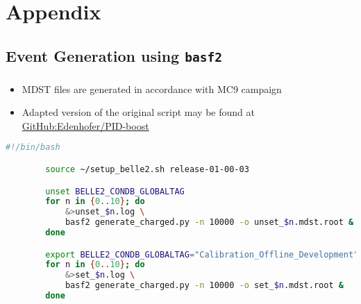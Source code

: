 \documentclass{beamer}
\begin{document}
\section{Appendix}
\subsection{Event Generation using \lstinline|basf2|}
\begin{frame}[fragile]
	\frametitle{\insertsection}
	\framesubtitle{\insertsubsection}

	\begin{itemize}
		\item MDST files are generated in accordance with MC9 campaign
		\item Adapted version of the original script may be found at \href{https://github.com/Edenhofer/PID-boost/blob/master/generate_charged.py}{GitHub:Edenhofer/PID-boost}
	\end{itemize}

	\begin{lstlisting}[language=bash,xleftmargin=-0.16\textwidth,basicstyle=\ttfamily\tiny]
		#!/bin/bash

		source ~/setup_belle2.sh release-01-00-03

		unset BELLE2_CONDB_GLOBALTAG
		for n in {0..10}; do
			&>unset_$n.log \
			basf2 generate_charged.py -n 10000 -o unset_$n.mdst.root &
		done

		export BELLE2_CONDB_GLOBALTAG="Calibration_Offline_Development"
		for n in {0..10}; do
			&>set_$n.log \
			basf2 generate_charged.py -n 10000 -o set_$n.mdst.root &
		done
	\end{lstlisting}
\end{frame}
\end{document}

